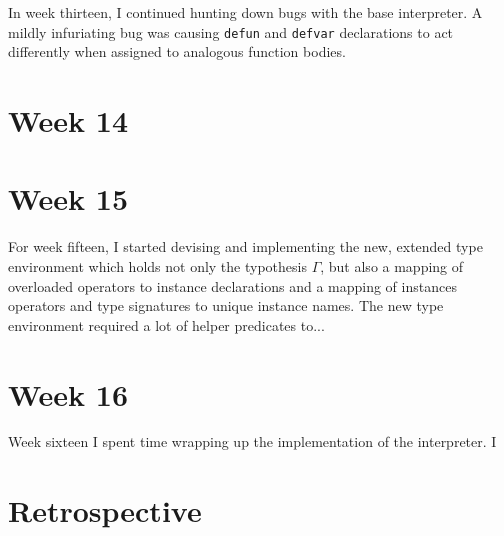 \documentclass[11pt,a4paper]{article}
\begin{document}
In week thirteen, I continued hunting down bugs with the base interpreter. A
mildly infuriating bug was causing \verb|defun| and \verb|defvar| declarations
to act differently when assigned to analogous function bodies.

\section*{Week 14}



\section*{Week 15}

For week fifteen, I started devising and implementing the new, extended type
environment which holds not only the typothesis $\Gamma$, but also a mapping
of overloaded operators to instance declarations and a mapping of instances
operators and type signatures to unique instance names. The new type
environment required a lot of helper predicates to...

\section*{Week 16}

Week sixteen I spent time wrapping up the implementation of the interpreter. I

\section*{Retrospective}
\end{document}
